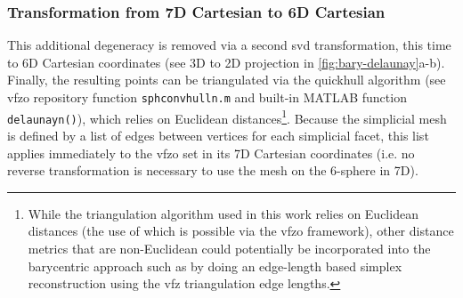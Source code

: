 \documentclass[final,twocolumn,12pt]{elsarticle}
\newcommand{\matlab}[1]{\mbox{\lstinline[style=Matlab-editor]{#1}}}
\newcommand{\inpt}{input}
\newcommand{\vfzorepo}{\gls{vfzo} repository}
\begin{document}
\begin{appendices}
\subsubsection{ Transformation from 7D Cartesian to 6D Cartesian}
\label{sec:app:bary:tri:svd2}
This additional degeneracy is removed via a second \gls{svd} transformation, this time to 6D Cartesian coordinates (see 3D to 2D projection in \cref{fig:bary-delaunay}a-b). Finally, the resulting points can be triangulated via the quickhull algorithm \cite{barberQuickhullAlgorithmConvex1996} (see \vfzorepo{} function \matlab{sphconvhulln.m} and built-in MATLAB function \matlab{delaunayn()}), which relies on Euclidean distances\footnote{While the triangulation algorithm used in this work relies on Euclidean distances (the use of which is possible via the \gls{vfzo} framework), other distance metrics that are non-Euclidean \cite{morawiecDistancesGrainInterfaces2019} could potentially be incorporated into the barycentric approach such as by doing an edge-length based simplex reconstruction \cite{connorHighdimensionalSimplexesSupermetric2017,boissonnatOnlyDistancesAre2017} using the \gls{vfz} triangulation edge lengths.}. Because the simplicial mesh is defined by a list of edges between vertices for each simplicial facet, this list applies immediately to the \gls{vfzo} set in its 7D Cartesian coordinates (i.e. no reverse transformation is necessary to use the mesh on the 6-sphere in 7D).



\end{appendices}
\end{document}
